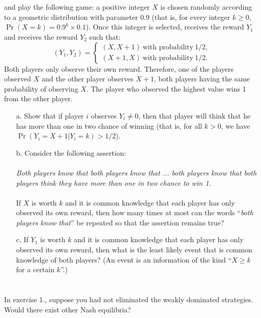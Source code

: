 \documentclass{../ape}
\newcommand{\X}{X}
\newcommand{\Y}{Y}
\begin{document}
\section{}
\TAone{} and \TAtwo{} play the following game: a positive integer $\X$ is chosen randomly according to a geometric distribution with parameter $0.9$ (that is, for every integer $k \geq 0$, $\Pr(\X = k) = 0.9 ^ k \times 0.1$). Once this integer is selected, \TAone{} receives the reward $\Y_1$ and \TAtwo{} receives the reward $\Y_2$ such that:
\begin{equation*}
	(\Y_1, \Y_2) = 
	\begin{cases}
		(\X, \X+1) \ \text{with probability} \ 1/2, \\
		(\X+1, \X) \ \text{with probability} \ 1/2.
	\end{cases}
\end{equation*}
Both players only observe their own reward. Therefore, one of the players observed $\X$ and the other player observes $\X + 1$, both players having the same probability of observing $\X$. The player who observed the highest value wins \SI{1}{\EUR} from the other player.
\begin{itemize}
	\item[a.] Show that if player $i$ observes $\Y_i \neq 0$, then that player will think that he has more than one in two chance of winning (that is, for all $k > 0$, we have $\Pr(\Y_i = \X+1 | \Y_i = k) > 1/2$).
	\item[b.] Consider the following assertion: \\
	\\
      \textit{Both players know that both players know that ... both players know that both players think they have more than one in two chance to win \SI{1}{\EUR}.} \\
	\\
	If $\X$ is worth $k$ and it is common knowledge that each player has only observed its own reward, then how many times at most can the words ``\textit{both players know that}'' be repeated so that the assertion remains true?
	\item[c.] If $\Y_1$ is worth $k$ and it is common knowledge that each player has only observed its own reward, then what is the least likely event that is common knowledge of both players? (An event is an information of the kind ``$\X \geq k$ for a certain $k$''.)
\end{itemize}

\section{}
In exercise 1., suppose you had not eliminated the weakly dominated strategies. Would there exist other Nash equilibria?
\end{document}
